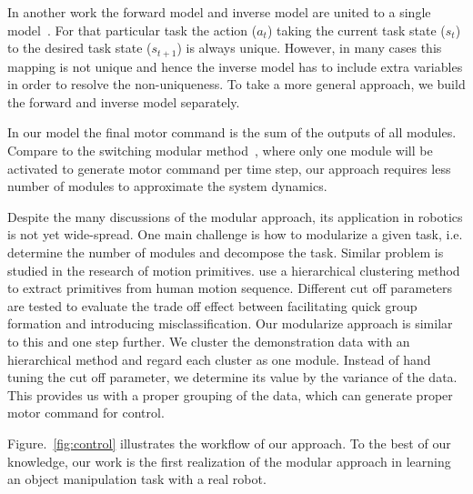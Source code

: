 In another work the forward model and inverse model are united to a single model~\citep{petkos2006learning}. For that particular task the action ($a_t$) taking the current task state ($s_t$) to the desired task state ($s_{t+1}$) is always unique. However, in many cases this mapping is not unique and hence the inverse model has to include extra variables in order to resolve the non-uniqueness. To take a more general approach, we build the forward and inverse model separately.

In our model the final motor command is the sum of the outputs of all modules. Compare to the switching modular method~\citep{narendra1997adaptive}, where only one module will be activated to generate motor command per time step, our approach requires less number of modules to approximate the system dynamics.




Despite the many discussions of the modular approach, its application in robotics is not yet wide-spread. One main challenge is how to modularize a given task, i.e. determine the number of modules and decompose the task. Similar problem is studied in the research of motion primitives. \citet{kulic2008incremental} use a hierarchical clustering method to extract primitives from human motion sequence. Different cut off parameters are tested to evaluate the trade off effect between facilitating quick group formation and introducing misclassification. Our modularize approach is similar to this and one step further. We cluster the demonstration data with an hierarchical method and regard each cluster as one module. Instead of hand tuning the cut off parameter, we determine its value by the variance of the data. This provides us with a proper grouping of the data, which can generate proper motor command for control.

Figure.~\ref{fig:control} illustrates the workflow of our approach. To the best of our knowledge, our work is the first realization of the modular approach in learning an object manipulation task with a real robot.



